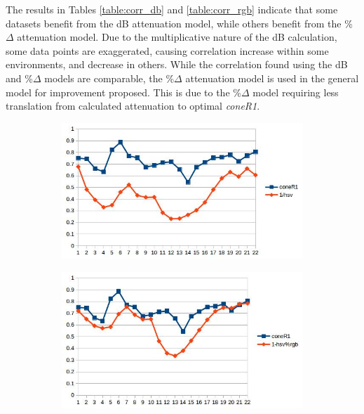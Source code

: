 \documentclass[12pt]{report}
\begin{document}
The results in Tables \ref{table:corr_db} and \ref{table:corr_rgb} indicate that some datasets benefit from the dB attenuation model, while others benefit from the \%$\Delta$ attenuation model. Due to the multiplicative nature of the dB calculation, some data points are exaggerated, causing correlation increase within some environments, and decrease in others. While the correlation found using the dB and \%$\Delta$ models are comparable, the \%$\Delta$ attenuation model is used in the general model for improvement proposed. This is due to the \%$\Delta$ model requiring less translation from calculated attenuation to optimal \textit{coneR1}.

\begin{figure}
\centering
\begin{subfigure}{.49\linewidth}
  \includegraphics[width=1\linewidth]{figures/correlations/db/room_hsv.jpg}
  \caption{}
\end{subfigure}
\hfill
\begin{subfigure}{.49\linewidth}
  \includegraphics[width=1\linewidth]{figures/correlations/rgb/room_hsv.jpg}
  \caption{}

\end{subfigure}
\end{figure}
\end{document}
